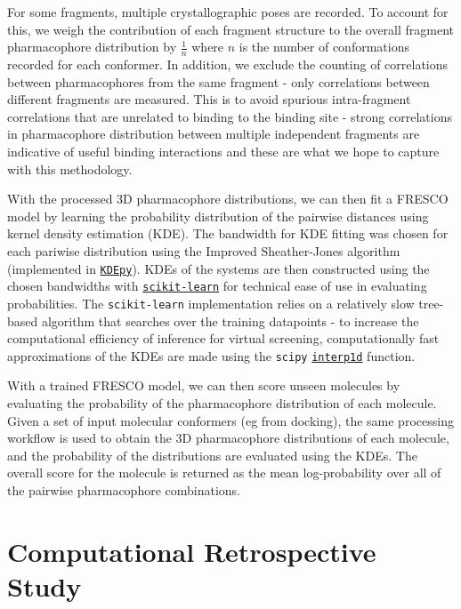For some fragments, multiple crystallographic poses are recorded. To account for this, we weigh the contribution of each fragment structure to the overall fragment pharmacophore distribution by $\frac{1}{n}$ where $n$ is the number of conformations recorded for each conformer. In addition, we exclude the counting of correlations between pharmacophores from the same fragment - only correlations between different fragments are measured. This is to avoid spurious intra-fragment correlations that are unrelated to binding to the binding site - strong correlations in pharmacophore distribution between multiple independent fragments are indicative of useful binding interactions and these are what we hope to capture with this methodology.

With the processed 3D pharmacophore distributions, we can then fit a FRESCO model by learning the probability distribution of the pairwise distances using kernel density estimation (KDE). The bandwidth for KDE fitting was chosen for each pariwise distribution using the Improved Sheather-Jones algorithm \cite{Botev2010ISJ} (implemented in \href{https://kdepy.readthedocs.io/en/latest/index.html}{\texttt{KDEpy}}). KDEs of the systems are then constructed using the chosen bandwidths with \href{https://scikit-learn.org/stable/}{\texttt{scikit-learn}} for technical ease of use in evaluating probabilities. The \texttt{scikit-learn} implementation relies on a relatively slow tree-based algorithm that searches over the training datapoints - to increase the computational efficiency of inference for virtual screening, computationally fast approximations of the KDEs are made using the \texttt{scipy} \href{https://docs.scipy.org/doc/scipy/reference/generated/scipy.interpolate.interp1d.html#scipy.interpolate.interp1d}{\texttt{interp1d}} function.

With a trained FRESCO model, we can then score unseen molecules by evaluating the probability of the pharmacophore distribution of each molecule. Given a set of input molecular conformers (eg from docking), the same processing workflow is used to obtain the 3D pharmacophore distributions of each molecule, and the probability of the distributions are evaluated using the KDEs. The overall score for the molecule is returned as the mean log-probability over all of the pairwise pharmacophore combinations.

\section{Computational Retrospective Study} \label{sec:retrospective}


